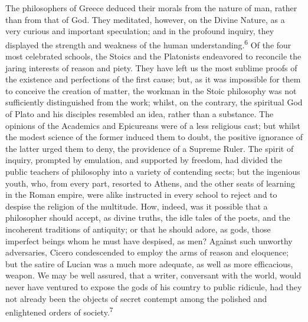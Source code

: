
The philosophers of Greece deduced their morals from the nature
of man, rather than from that of God. They meditated, however, on
the Divine Nature, as a very curious and important speculation;
and in the profound inquiry, they displayed the strength and
weakness of the human understanding.\textsuperscript{6} Of the four most
celebrated schools, the Stoics and the Platonists endeavored to
reconcile the jaring interests of reason and piety. They have
left us the most sublime proofs of the existence and perfections
of the first cause; but, as it was impossible for them to
conceive the creation of matter, the workman in the Stoic
philosophy was not sufficiently distinguished from the work;
whilst, on the contrary, the spiritual God of Plato and his
disciples resembled an idea, rather than a substance. The
opinions of the Academics and Epicureans were of a less religious
cast; but whilst the modest science of the former induced them to
doubt, the positive ignorance of the latter urged them to deny,
the providence of a Supreme Ruler. The spirit of inquiry,
prompted by emulation, and supported by freedom, had divided the
public teachers of philosophy into a variety of contending sects;
but the ingenious youth, who, from every part, resorted to
Athens, and the other seats of learning in the Roman empire, were
alike instructed in every school to reject and to despise the
religion of the multitude. How, indeed, was it possible that a
philosopher should accept, as divine truths, the idle tales of
the poets, and the incoherent traditions of antiquity; or that he
should adore, as gods, those imperfect beings whom he must have
despised, as men? Against such unworthy adversaries, Cicero
condescended to employ the arms of reason and eloquence; but the
satire of Lucian was a much more adequate, as well as more
efficacious, weapon. We may be well assured, that a writer,
conversant with the world, would never have ventured to expose
the gods of his country to public ridicule, had they not already
been the objects of secret contempt among the polished and
enlightened orders of society.\textsuperscript{7}


